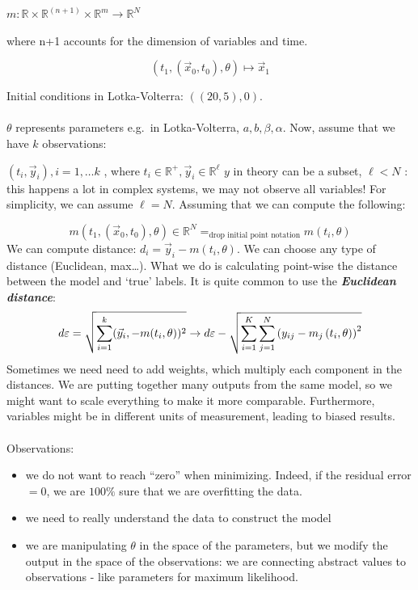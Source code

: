 $m: \mathbb{R} \times \mathbb{R}^{(n+1)} \times \mathbb{R}^m \rightarrow \mathbb{R}^N$

where n+1 accounts for the dimension of variables and time.

$$
\left(t_1,\left(\vec{x}_0, t_0\right), \theta\right)
\longmapsto \vec{x}_1 $$

Initial conditions in Lotka-Volterra: $((20,5), 0)$. 
\\
\\
\noindent
$\theta$ represents parameters e.g.~in Lotka-Volterra, $a,b,\beta,\alpha$. Now, assume that we have $k$ observations:

$(t_i ,\vec{y}_i), i=1, \ldots k$ , where
$t_i \in \mathbb{R}^+, \vec{y}_i \in \mathbb{R}^\ell$
\noindent
$y$ in theory can be a subset, $\ell<N$ : this happens a lot in complex
systems, we may not observe all variables! For simplicity, we can assume
$\ell=N$. Assuming that we can compute the following:

$$m\left(t_1,\left(\vec{x}_0, t_0\right), \theta\right) \in \mathbb{R}^{N} =_{\text{drop initial point notation}} m(t_i,\theta)$$
\noindent
We can compute distance: $d_i=\vec{y}_i-m(t_i, \theta)$.
\noindent
We can choose any type of distance (Euclidean, max\ldots). What we do is
calculating point-wise the distance between the model and `true' labels.
It is quite common to use the \textbf{\emph{Euclidean distance}}:
$$d \varepsilon =\sqrt{\sum_{i=1}^k(\vec{y}_i,-m(t_i, \theta))^2}\\
\rightarrow d{\varepsilon}-\sqrt{\sum_{i=1}^{K} \sum_{j=1}^{N} \left(y_{ij}-m_j\left(t_i, \theta\right)\right)^2}$$
\noindent
Sometimes we need need to add weights, which multiply each component in
the distances. We are putting together many outputs from the same model,
so we might want to scale everything to make it more comparable.
Furthermore, variables might be in different units of measurement,
leading to biased results.
\\
\\
\noindent
Observations:

\begin{itemize}
\tightlist
\item
  we do not want to reach ``zero'' when minimizing. Indeed, if the
  residual error $=0$, we are $100 \%$ sure that we are overfitting the
  data.
\item
  we need to really understand the data to construct the model
\item
  we are manipulating $\theta$ in the space of the parameters, but we
  modify the output in the space of the observations: we are connecting
  abstract values to observations - like parameters for maximum
  likelihood.
\end{itemize}

